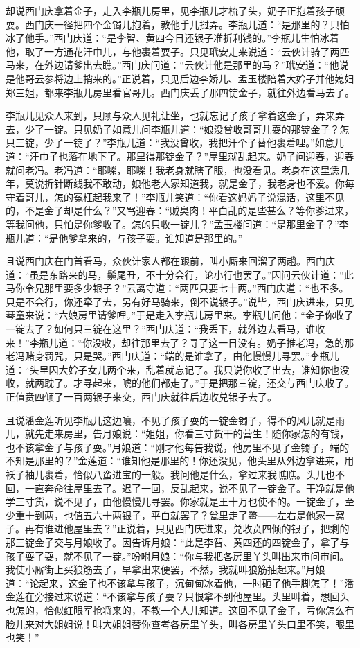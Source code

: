 却说西门庆拿着金子，走入李瓶儿房里，见李瓶儿才梳了头，奶子正抱着孩子顽耍。西门庆一径把四个金镯儿抱着，教他手儿挝弄。李瓶儿道：“是那里的？只怕冰了他手。”西门庆道：“是李智、黄四今日还银子准折利钱的。”李瓶儿生怕冰着他，取了一方通花汗巾儿，与他裹着耍子。只见玳安走来说道：“云伙计骑了两匹马来，在外边请爹出去瞧。”西门庆问道：“云伙计他是那里的马？”玳安道：“他说是他哥云参将边上捎来的。”正说着，只见后边李娇儿、孟玉楼陪着大妗子并他媳妇郑三姐，都来李瓶儿房里看官哥儿。西门庆丢了那四锭金子，就往外边看马去了。

李瓶儿见众人来到，只顾与众人见礼让坐，也就忘记了孩子拿着这金子，弄来弄去，少了一锭。只见奶子如意儿问李瓶儿道：“娘没曾收哥哥儿耍的那锭金子？怎只三锭，少了一锭了？”李瓶儿道：“我没曾收，我把汗个子替他裹着哩。”如意儿道：“汗巾子也落在地下了。那里得那锭金子？”屋里就乱起来。奶子问迎春，迎春就问老冯。老冯道：“耶嚛，耶嚛！我老身就瞎了眼，也没看见。老身在这里恁几年，莫说折针断线我不敢动，娘他老人家知道我，就是金子，我老身也不爱。你每守着哥儿，怎的冤枉起我来了！”李瓶儿笑道：“你看这妈妈子说混话，这里不见的，不是金子却是什么？”又骂迎春：“贼臭肉！平白乱的是些甚么？等你爹进来，等我问他，只怕是你爹收了。怎的只收一锭儿？”孟玉楼问道：“是那里金子？”李瓶儿道：“是他爹拿来的，与孩子耍。谁知道是那里的。”

且说西门庆在门首看马，众伙计家人都在跟前，叫小厮来回溜了两趟。西门庆道：“虽是东路来的马，鬃尾丑，不十分会行，论小行也罢了。”因问云伙计道：“此马你令兄那里要多少银子？”云离守道：“两匹只要七十两。”西门庆道：“也不多。只是不会行，你还牵了去，另有好马骑来，倒不说银子。”说毕，西门庆进来，只见琴童来说：“六娘房里请爹哩。”于是走入李瓶儿房里来。李瓶儿问他：“金子你收了一锭去了？如何只三锭在这里？”西门庆道：“我丢下，就外边去看马，谁收来！”李瓶儿道：“你没收，却往那里去了？寻了这一日没有。奶子推老冯，急的那老冯赌身罚咒，只是哭。”西门庆道：“端的是谁拿了，由他慢慢儿寻罢。”李瓶儿道：“头里因大妗子女儿两个来，乱着就忘记了。我只说你收了出去，谁知你也没收，就两耽了。才寻起来，唬的他们都走了。”于是把那三锭，还交与西门庆收了。正值贲四倾了一百两银子来交，西门庆就往后边收兑银子去了。

且说潘金莲听见李瓶儿这边嚷，不见了孩子耍的一锭金镯子，得不的风儿就是雨儿，就先走来房里，告月娘说：“姐姐，你看三寸货干的营生！随你家怎的有钱，也不该拿金子与孩子耍。”月娘道：“刚才他每告我说，他房里不见了金镯子，端的不知是那里的？”金莲道：“谁知他是那里的！你还没见，他头里从外边拿进来，用袄子袖儿裹着，恰似八蛮进宝的一般。我问他是什么，拿过来我瞧瞧。头儿也不回，一直奔命往屋里去了。迟了一回，反乱起来，说不见了一锭金子。干净就是他学三寸货，说不见了，由他慢慢儿寻罢。你家就是王十万也使不的。一锭金子，至少重十到两，也值五六十两银子，平白就罢了？瓮里走了鳖——左右是他家一窝子。再有谁进他屋里去？”正说着，只见西门庆进来，兑收贲四倾的银子，把剩的那三锭金子交与月娘收了。因告诉月娘：“此是李智、黄四还的四锭金子，拿了与孩子耍了耍，就不见了一锭。”吩咐月娘：“你与我把各房里丫头叫出来审问审问。我使小厮街上买狼筋去了，早拿出来便罢，不然，我就叫狼筋抽起来。”月娘道：“论起来，这金子也不该拿与孩子，沉甸甸冰着他，一时砸了他手脚怎了！”潘金莲在旁接过来说道：“不该拿与孩子耍？只恨拿不到他屋里。头里叫着，想回头也怎的，恰似红眼军抢将来的，不教一个人儿知道。这回不见了金子，亏你怎么有脸儿来对大姐姐说！叫大姐姐替你查考各房里丫头，叫各房里丫头口里不笑，眼里也笑！”

